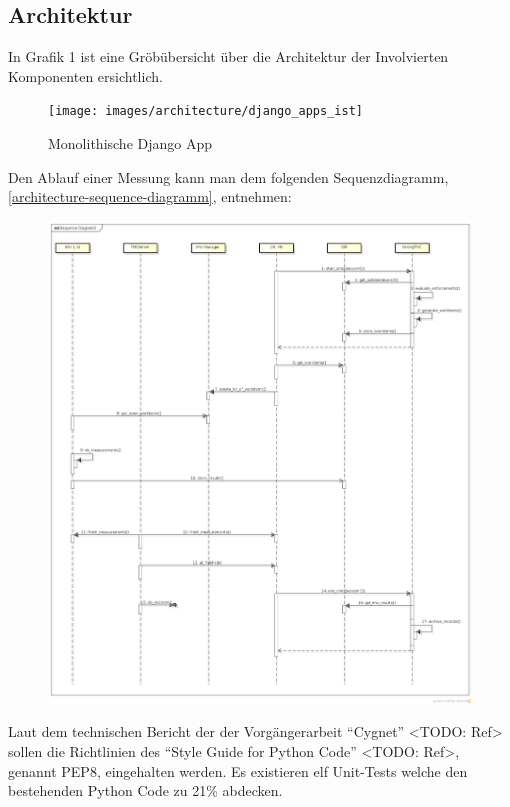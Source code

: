 \subsection{Architektur}
In Grafik 1 ist eine Gröbübersicht über die Architektur der Involvierten Komponenten ersichtlich. 

\begin{figure}[H]
	\centering
	\texttt{[image: images/architecture/django\_apps\_ist]}
    \caption{Monolithische Django App}
    \label{django-ist-diagram}
\end{figure}

Den Ablauf einer Messung kann man dem folgenden Sequenzdiagramm,
\autoref{architecture-sequence-diagramm}, entnehmen:
\begin{figure}[H]
	\centering
	\includegraphics[width=\textwidth]{./images/architecture/architecture_sequence_diagramm-2014-03-12}
	\caption{}
	\label{architecture-sequence-diagramm}
\end{figure}

Laut dem technischen Bericht der der Vorgängerarbeit \enquote{Cygnet} <TODO:
Ref> sollen die Richtlinien des \enquote{Style Guide for Python Code} <TODO:
Ref>, genannt PEP8, eingehalten werden. Es existieren elf Unit-Tests welche den
bestehenden Python Code zu 21\% abdecken.\\


